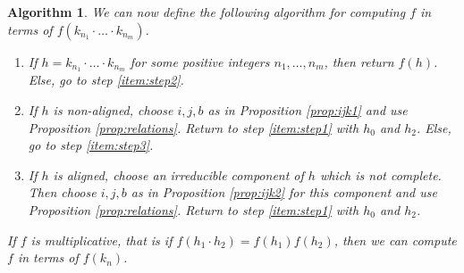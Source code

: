 \documentclass[10pt]{amsart}
\newtheorem{Alg}[Lem]{Algorithm}
\theoremstyle{definition}
\begin{document}
\begin{Alg}
\label{alg:alg}
We can now define the following algorithm for computing $f$ in terms of $f(k_{n_1}\cdot\ldots\cdot k_{n_m})$.
\begin{enumerate}
    \item\label{item:step1} If $h=k_{n_1}\cdot\ldots\cdot k_{n_m}$ for some positive integers $n_1,\ldots, n_m$, then return $f(h)$. Else, go to step \eqref{item:step2}.
    \item\label{item:step2} If $h$ is non-aligned, choose $i,j,b$ as in Proposition \ref{prop:ijk1} and use Proposition \ref{prop:relations}. Return to step \eqref{item:step1} with $h_0$ and $h_2$. Else, go to step \eqref{item:step3}.
    \item\label{item:step3} If $h$ is aligned, choose an irreducible component of $h$ which is not complete. Then choose $i,j,b$ as in Proposition \ref{prop:ijk2} for this component and use Proposition \ref{prop:relations}. Return to step \eqref{item:step1} with $h_0$ and $h_2$.
\end{enumerate}
If $f$ is multiplicative, that is if $f(h_1\cdot h_2)=f(h_1)f(h_2)$, then we can compute $f$ in terms of $f(k_n)$.
\end{Alg}
\end{document}
